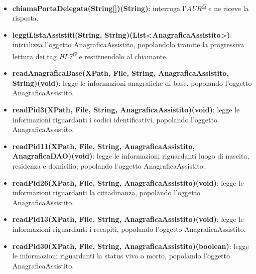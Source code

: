 \documentclass[a4paper]{article}
\begin{document}
\begin{itemize}
	\item \textbf{chiamaPortaDelegata(String[])(String)}: interroga l'\textit{AUR\textsuperscript{\hyperref[sec:gl]{G}}} e ne riceve la risposta.
    \item \textbf{leggiListaAssistiti(String, String)(List<AnagraficaAssistito>)}: inizializza l'oggetto AnagraficaAssistito, popolandolo tramite la progressiva lettura dei tag \textit{HL7\textsuperscript{\hyperref[sec:gl]{G}}} e restituendolo al chiamante.
	\item \textbf{readAnagraficaBase(XPath, File, String, AnagraficaAssistito, String)(void)}: legge le informazioni anagrafiche di base, popolando l'oggetto AnagraficaAssistito.
	\item \textbf{readPid3(XPath, File, String, AnagraficaAssistito)(void)}: legge le informazioni riguardanti i codici identificativi, popolando l'oggetto AnagraficaAssistito.
	\item \textbf{readPid11(XPath, File, String, AnagraficaAssistito, AnagraficaDAO)(void)}: legge le informazioni riguardanti luogo di nascita, residenza e domicilio, popolando l'oggetto AnagraficaAssistito.
	\item \textbf{readPid26(XPath, File, String, AnagraficaAssistito)(void)}: legge le informazioni riguardanti la cittadinanza, popolando l'oggetto AnagraficaAssistito.
	\item \textbf{readPid13(XPath, File, String, AnagraficaAssistito)(void)}: legge le informazioni riguardanti i recapiti, popolando l'oggetto AnagraficaAssistito.
	\item \textbf{readPid30(XPath, File, String, AnagraficaAssistito)(boolean)}: legge le informazioni riguardanti la status vivo o morto, popolando l'oggetto AnagraficaAssistito.
\end{itemize}
\end{document}
